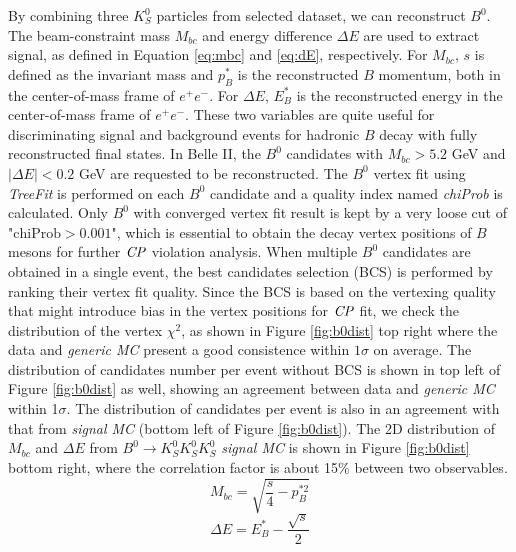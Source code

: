 By combining three $K_S^0$ particles from selected dataset, we can reconstruct $B^0$. The beam-constraint mass $M_{bc}$ and energy difference $\Delta E$ are used to extract signal, as defined in Equation \ref{eq:mbc} and \ref{eq:dE}, respectively. For $M_{bc}$, $s$ is defined as the invariant mass and $p^*_B$ is the reconstructed $B$ momentum, both in the center-of-mass frame of $e^+e^-$. For $\Delta E$, $E^*_B$ is the reconstructed energy in the center-of-mass frame of $e^+e^-$. These two variables are quite useful for discriminating signal and background events for hadronic $B$ decay with fully reconstructed final states.
 In Belle II, the $B^0$ candidates with $M_{bc} > 5.2$ GeV and $|\Delta{E}| < 0.2$ GeV are requested to be reconstructed. The $B^0$ vertex fit using \textit{TreeFit} is performed on each $B^0$ candidate and a quality index named \textit{chiProb} is calculated.  Only $B^0$ with converged vertex fit result is kept by a very loose cut of "$\text{chiProb} > 0.001$", which is essential to obtain the decay vertex positions of $B$ mesons for further $\it{CP}$ violation analysis. When multiple $B^0$ candidates are obtained in a single event, the best candidates selection (BCS) is performed by ranking their vertex fit quality. Since the BCS is based on the vertexing quality that might introduce bias in the vertex positions for $\it{CP}$ fit, we check the distribution of the vertex $\chi^2$, as shown in Figure \ref{fig:b0dist} top right where the data and \textit{generic MC} present a good consistence within $1\sigma$ on average. The distribution of candidates number per event without BCS is shown in top left of Figure \ref{fig:b0dist} as well, showing an agreement between data and \textit{generic MC} within 1$\sigma$. The distribution of candidates per event is also in an agreement with that from \textit{signal MC} (bottom left of Figure \ref{fig:b0dist}). The 2D distribution of $M_{bc}$ and $\Delta E$ from $B^0 \to K_S^0  K_S^0  K_S^0$ \textit{signal MC} is shown in Figure \ref{fig:b0dist}  bottom right, where the correlation factor is about 15\% between two observables. 
 \begin{equation}\label{eq:mbc}
 M_{bc} = \sqrt{\frac{s}{4}-p^{*2}_B} 
 \end{equation}
 \begin{equation}\label{eq:dE}
 \Delta E = E^*_B - \frac{\sqrt{s}}{2}
 \end{equation}
 
